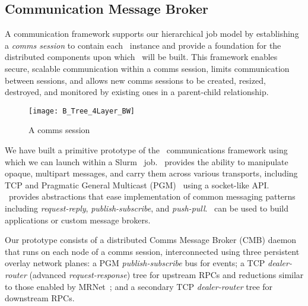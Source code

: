 \subsection{Communication Message Broker}


A communication framework supports our hierarchical job model
by establishing a {\em comms session} to contain each \flux\ instance
and provide a foundation for the distributed components upon which
\flux\ will be built.
This framework enables secure, scalable communication
within a comms session, limits communication between sessions,
and allows new comms sessions to be created, resized, destroyed,
and monitored by existing ones in a parent-child relationship.

\begin{figure}
\vspace{-.5cm}
\centering
\texttt{[image: B\_Tree\_4Layer\_BW]}
\vspace{-.3cm}
\caption{A comms session} 
\vspace{-.5cm}
\label{fig:commswireup}
\end{figure}

We have built a primitive prototype of the \flux\ communications framework
using \zMQ~\cite{ZMQGuide} which we can launch within a
Slurm~\cite{Jette02slurm} job.
\zMQ\ provides the ability to manipulate opaque,
multipart messages, and carry them across various transports, including
TCP and Pragmatic General Multicast (PGM)~\cite{rfc3208}
using a socket-like API.
\zMQ\ provides abstractions that ease implementation of common
messaging patterns including {\em request-reply}, {\em publish-subscribe},
and {\em push-pull}.
\zMQ\ can be used to build applications or custom message brokers.


Our prototype consists of a distributed Comms Message Broker (CMB)
daemon that runs on each node of a comms session, interconnected using
three persistent overlay network planes:
a PGM {\em publish-subscribe} bus for events; 
a TCP {\em dealer-router} (advanced {\em request-response})
tree for upstream RPCs and reductions
similar to those enabled by MRNet~\cite{mrnet}; and
a secondary TCP {\em dealer-router} tree for downstream RPCs.


